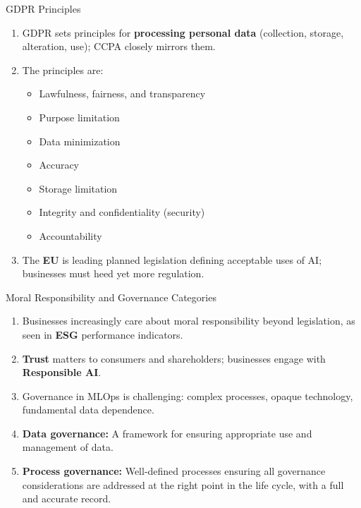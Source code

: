 \begin{frame}{GDPR Principles}
\begin{enumerate}
\item<1-> GDPR sets principles for \textbf{processing personal data} (collection, storage, alteration, use); CCPA closely mirrors them.
\item<2-> The principles are:
    \begin{itemize}
    \item Lawfulness, fairness, and transparency
    \item Purpose limitation
    \item Data minimization
    \item Accuracy
    \item Storage limitation
    \item Integrity and confidentiality (security)
    \item Accountability
    \end{itemize}
\item<3-> The \textbf{EU} is leading planned legislation defining acceptable uses of AI; businesses must heed yet more regulation.
\end{enumerate}
\end{frame}

\begin{frame}{Moral Responsibility and Governance Categories}
\begin{enumerate}
\item<1-> Businesses increasingly care about moral responsibility beyond legislation, as seen in \textbf{ESG} performance indicators.
\item<2-> \textbf{Trust} matters to consumers and shareholders; businesses engage with \textbf{Responsible AI}.
\item<3-> Governance in MLOps is challenging: complex processes, opaque technology, fundamental data dependence.
\item<4-> \textbf{Data governance:} A framework for ensuring appropriate use and management of data.
\item<5-> \textbf{Process governance:} Well-defined processes ensuring all governance considerations are addressed at the right point in the life cycle, with a full and accurate record.
\end{enumerate}
\end{frame}

